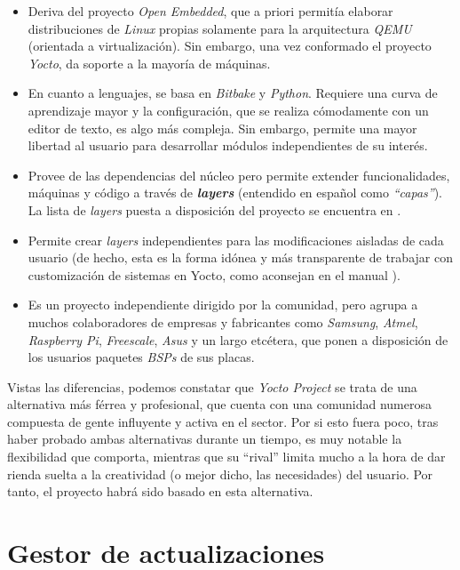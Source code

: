 \begin{itemize}
	\item Deriva del proyecto \textit{Open Embedded}, que a priori permitía elaborar distribuciones de \textit{Linux} propias solamente para la arquitectura \textit{QEMU} (orientada a virtualización). Sin embargo, una vez conformado el proyecto \textit{Yocto}, da soporte a la mayoría de máquinas.
	\item En cuanto a lenguajes, se basa en \textit{Bitbake} y \textit{Python}. Requiere una curva de aprendizaje mayor y la configuración, que se realiza cómodamente con un editor de texto, es algo más compleja. Sin embargo, permite una mayor libertad al usuario para desarrollar módulos independientes de su interés.
	\item Provee de las dependencias del núcleo pero permite extender funcionalidades, máquinas y código a través de \textbf{\textit{layers}} (entendido en español como \textit{``capas''}). La lista de \textit{layers} puesta a disposición del proyecto se encuentra en \cite{yocto-layers-list}.
	\item Permite crear \textit{layers} independientes para las modificaciones aisladas de cada usuario (de hecho, esta es la forma idónea y más transparente de trabajar con customización de sistemas en Yocto, como aconsejan en el manual \cite{yocto-manual-own-distro}).
	\item Es un proyecto independiente dirigido por la comunidad, pero agrupa a muchos colaboradores de empresas y fabricantes como \textit{Samsung}, \textit{Atmel}, \textit{Raspberry Pi}, \textit{Freescale}, \textit{Asus} y un largo etcétera, que ponen a disposición de los usuarios paquetes \textit{BSPs} de sus placas.
\end{itemize}

Vistas las diferencias, podemos constatar que \textit{Yocto Project} se trata de una alternativa más férrea y profesional, que cuenta con una comunidad numerosa compuesta de gente influyente y activa en el sector. Por si esto fuera poco, tras haber probado ambas alternativas durante un tiempo, es muy notable la flexibilidad que comporta, mientras que su ``rival'' limita mucho a la hora de dar rienda suelta a la creatividad (o mejor dicho, las necesidades) del usuario. Por tanto, el proyecto habrá sido basado en esta alternativa.

\section{Gestor de actualizaciones}

